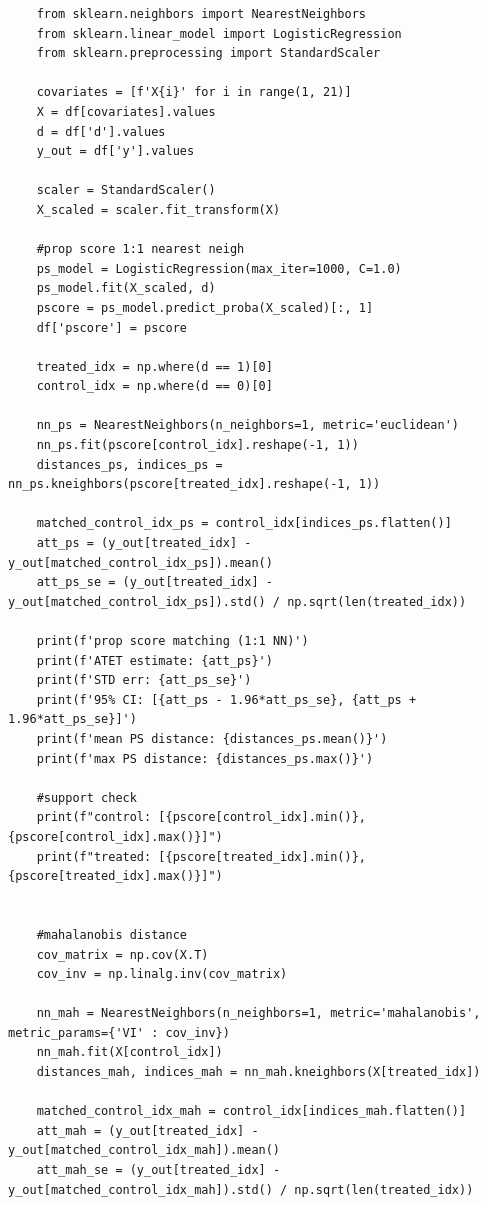 \documentclass[10pt]{article}
\begin{document}
\begin{lstlisting}
    from sklearn.neighbors import NearestNeighbors
    from sklearn.linear_model import LogisticRegression
    from sklearn.preprocessing import StandardScaler

    covariates = [f'X{i}' for i in range(1, 21)]
    X = df[covariates].values 
    d = df['d'].values
    y_out = df['y'].values

    scaler = StandardScaler()
    X_scaled = scaler.fit_transform(X)

    #prop score 1:1 nearest neigh
    ps_model = LogisticRegression(max_iter=1000, C=1.0)
    ps_model.fit(X_scaled, d)
    pscore = ps_model.predict_proba(X_scaled)[:, 1]
    df['pscore'] = pscore 

    treated_idx = np.where(d == 1)[0]
    control_idx = np.where(d == 0)[0]

    nn_ps = NearestNeighbors(n_neighbors=1, metric='euclidean')
    nn_ps.fit(pscore[control_idx].reshape(-1, 1))
    distances_ps, indices_ps = nn_ps.kneighbors(pscore[treated_idx].reshape(-1, 1))

    matched_control_idx_ps = control_idx[indices_ps.flatten()]
    att_ps = (y_out[treated_idx] - y_out[matched_control_idx_ps]).mean()
    att_ps_se = (y_out[treated_idx] - y_out[matched_control_idx_ps]).std() / np.sqrt(len(treated_idx))

    print(f'prop score matching (1:1 NN)')
    print(f'ATET estimate: {att_ps}')
    print(f'STD err: {att_ps_se}')
    print(f'95% CI: [{att_ps - 1.96*att_ps_se}, {att_ps + 1.96*att_ps_se}]')
    print(f'mean PS distance: {distances_ps.mean()}')
    print(f'max PS distance: {distances_ps.max()}')

    #support check 
    print(f"control: [{pscore[control_idx].min()}, {pscore[control_idx].max()}]")
    print(f"treated: [{pscore[treated_idx].min()}, {pscore[treated_idx].max()}]")


    #mahalanobis distance 
    cov_matrix = np.cov(X.T)
    cov_inv = np.linalg.inv(cov_matrix)

    nn_mah = NearestNeighbors(n_neighbors=1, metric='mahalanobis', metric_params={'VI' : cov_inv})
    nn_mah.fit(X[control_idx])
    distances_mah, indices_mah = nn_mah.kneighbors(X[treated_idx])

    matched_control_idx_mah = control_idx[indices_mah.flatten()]
    att_mah = (y_out[treated_idx] - y_out[matched_control_idx_mah]).mean()
    att_mah_se = (y_out[treated_idx] - y_out[matched_control_idx_mah]).std() / np.sqrt(len(treated_idx))


\end{lstlisting}
\end{document}
